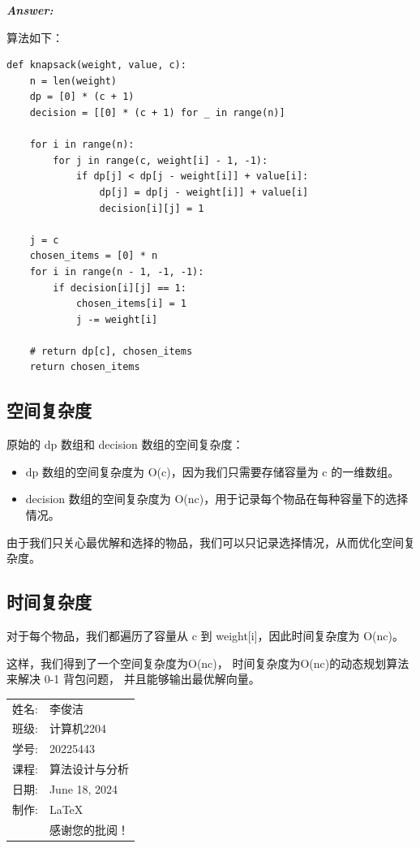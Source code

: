 \documentclass[12pt]{article}
\newenvironment{Answer}{
  \vspace{12pt}
  {\large\textbf{\textit{\hspace{-12pt}Answer:}}}\par
  \vspace{8pt}
} {\vspace{24pt}}
\begin{document}
\begin{Answer}
算法如下：

\begin{lstlisting}
def knapsack(weight, value, c):
    n = len(weight)
    dp = [0] * (c + 1)
    decision = [[0] * (c + 1) for _ in range(n)]

    for i in range(n):
        for j in range(c, weight[i] - 1, -1):
            if dp[j] < dp[j - weight[i]] + value[i]:
                dp[j] = dp[j - weight[i]] + value[i]
                decision[i][j] = 1

    j = c
    chosen_items = [0] * n
    for i in range(n - 1, -1, -1):
        if decision[i][j] == 1:
            chosen_items[i] = 1
            j -= weight[i]

    # return dp[c], chosen_items
    return chosen_items
\end{lstlisting}

\subsection*{空间复杂度}
\noindent

原始的 dp 数组和 decision 数组的空间复杂度：

\begin{itemize}
  \item dp 数组的空间复杂度为 O(c)，因为我们只需要存储容量为 c 的一维数组。
  \item decision 数组的空间复杂度为 O(nc)，用于记录每个物品在每种容量下的选择情况。
\end{itemize}

由于我们只关心最优解和选择的物品，我们可以只记录选择情况，从而优化空间复杂度。

\subsection*{时间复杂度}
\noindent

对于每个物品，我们都遍历了容量从 c 到 weight[i]，因此时间复杂度为 O(nc)。

这样，我们得到了一个空间复杂度为O(nc)，
时间复杂度为O(nc)的动态规划算法来解决 0-1 背包问题，
并且能够输出最优解向量。

\end{Answer}

\begin{flushright}\begin{tabular}{rl}
  姓名: & 李俊洁\\
  班级: & 计算机2204 \\
  学号: & 20225443 \\
  课程: & 算法设计与分析 \\
  日期: & June 18, 2024 \\
  制作: & \LaTeX \\
  & 感谢您的批阅！
\end{tabular}\end{flushright}
\end{document}
